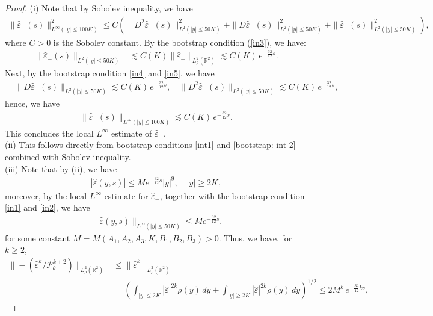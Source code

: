 \documentclass[11pt,reqno]{amsart}
\theoremstyle{definition}
\theoremstyle{bfremark}
\numberwithin{equation}{section}
\newcommand{\veph}{\hat\varepsilon }
\begin{document}
\begin{proof}(i) Note that by Sobolev inequality, we have
    \begin{align*}
      \|\veph_-(s)\|^2_{L^{\infty}(|y| \leq 100K)} \leq C\left(\|D^2 \veph_-(s)\|^2_{L^2(|y| \leq 50K)}+\|D \veph_-(s)\|^2_{L^2(|y| \leq 50K)}+\|\veph_-(s)\|^2_{L^2(|y| \leq 50K)}\right),
    \end{align*}
    where \(C>0\) is the Sobolev constant. By the bootstrap condition (\ref{in3}), we have:
   \begin{align*}
    \|\veph_-(s)\|_{L^2(|y| \leq 50K)}& \lesssim C(K) \|\veph_-\|_{L^2_{\rho}(\mathbb{R}^2)} \lesssim C(K)\,e^{-\frac{32}{12}s}.
   \end{align*}
Next, by the bootstrap condition \ref{in4} and \ref{in5}, we have
   \begin{align*}
      &\|D \veph_-(s)\|_{L^2(|y| \leq 50K)} \lesssim C(K)\,e^{-\frac{32}{12}s}, \quad \|D^2 \veph_-(s)\|_{L^2(|y| \leq 50K)} \lesssim C(K)\,e^{-\frac{32}{12}s},
   \end{align*}
hence, we have
   \begin{align*}
      \|\veph_-(s)\|_{L^{\infty}(|y| \leq 100 K)} \lesssim  C(K)\,e^{-\frac{32}{12}s}.
   \end{align*} 
This concludes the local \(L^{\infty}\) estimate of \(\veph_-\).\\
 (ii) This follows directly from bootstrap conditions \ref{int1} and \ref{bootstrap: int 2} combined with Sobolev inequality.\\
(iii)
Note that by (ii), we have
\begin{align}
\label{inq:ptwise1}
    |\veph(y,s)| \leq M e^{-\frac{32}{12}s}|y|^9, \quad |y| \geq 2K,
\end{align}
moreover, by the local \(L^{\infty}\) estimate for \(\veph_-\), together with the bootstrap condition \ref{in1} and \ref{in2}, we have
\begin{align}
\label{ptwise local veph 0}
    \|\veph(y,s)\|_{L^{\infty}(|y|\leq 50K)} \leq Me^{-\frac{32}{12}s}.
\end{align}
for some constant \(M=M(A_1,A_2,A_3,K,B_1,B_2,B_3)>0\). Thus, we have, for \(k \geq 2\),
    \begin{align*}
        \|-(\veph^k/\mathcal{P}_{\theta}^{k+2})\|_{L^2_{\rho}(\mathbb{R}^2)}& \leq \|\veph^k\|_{L^2_{\rho}(\mathbb{R}^2)}\\
        &=\left(\int_{|y| \leq 2K}|\veph|^{2k}\rho(y)\,dy+\int_{|y| \geq 2K}|\veph|^{2k}\rho(y)\,dy\right)^{1/2} \leq 2M^k\,e^{-\frac{32}{12}ks},
    \end{align*}

\end{proof}
\end{document}
